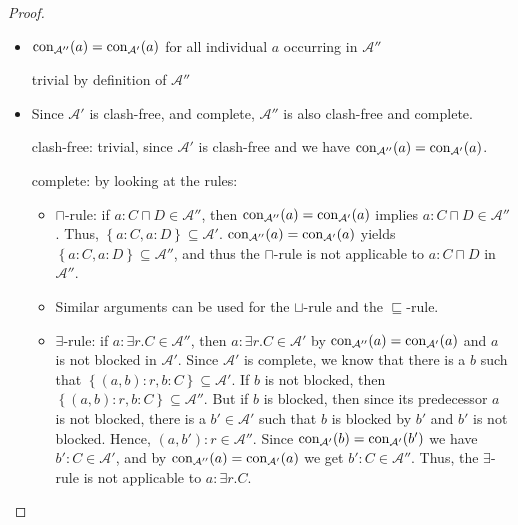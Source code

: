 \begin{proof}
\begin{itemize}
		\item $\operatorname{\text{con}}_{\mathcal{A}''}(a) =  \operatorname{\text{con}}_{\mathcal{A}'}(a)$ for all individual $a$ occurring in $\mathcal{A}''$ 
			\begin{subproof}
				trivial by definition of  $\mathcal{A}''$
			\end{subproof}

		\item Since $\mathcal{A}'$ is clash-free, and complete, $\mathcal{A}''$ is also clash-free and complete.
			\begin{subproof}
				clash-free: trivial, since  $\mathcal{A}'$ is clash-free
				and we have $\operatorname{\text{con}}_{\mathcal{A}''}(a) =  \operatorname{\text{con}}_{\mathcal{A}'}(a)$.

				complete: by looking at the rules:
				\begin{itemize}
					\item $\sqcap$-rule: if $a : C \sqcap D \in \mathcal{A}''$,
						then $\operatorname{\text{con}}_{\mathcal{A}''}(a) =  \operatorname{\text{con}}_{\mathcal{A}'}(a)$ implies
						$a : C \sqcap D \in \mathcal{A}''$.
						Thus, $\left\{ a:C, a:D \right\}\subseteq \mathcal{A}'$.
						$\operatorname{\text{con}}_{\mathcal{A}''}(a) =  \operatorname{\text{con}}_{\mathcal{A}'}(a)$	yields $\left\{ a:C, a:D \right\}\subseteq \mathcal{A}''$,
						and thus the $\sqcap$-rule is not applicable to $a:C \sqcap D$ in $\mathcal{A}''$.
					\item Similar arguments can be used for the $\sqcup$-rule and the $\sqsubseteq$-rule.
					\item $\exists$-rule: if $a: \exists r.C \in \mathcal{A}''$,
						then $a : \exists r.C \in \mathcal{A}'$ by $\operatorname{\text{con}}_{\mathcal{A}''}(a) =  \operatorname{\text{con}}_{\mathcal{A}'}(a)$
						and $a$ is not blocked in $\mathcal{A}'$.
						Since $\mathcal{A}'$ is complete, we know that there is a $b$ such that
						$\left\{ (a,b):r, b:C \right\} \subseteq \mathcal{A}'$.
						If $b$ is not blocked, then $\left\{ (a,b):r, b:C \right\} \subseteq \mathcal{A}''$.
						But if $b$ is blocked, then since its predecessor $a$ is not blocked,
						there is a $b' \in \mathcal{A}'$ such that $b$ is blocked by $b'$
						and $b'$ is not blocked.
						Hence, $(a,b'):r \in \mathcal{A}''$.
						Since $\operatorname{\text{con}}_{\mathcal{A}'}(b) =  \operatorname{\text{con}}_{\mathcal{A}'}(b')$ we have
						$b':C \in \mathcal{A}'$, and by $\operatorname{\text{con}}_{\mathcal{A}''}(a) =  \operatorname{\text{con}}_{\mathcal{A}'}(a)$ we get
						$b':C \in \mathcal{A}''$.
						Thus, the $\exists$-rule is not applicable to $a: \exists r.C$.
						\qedhere
				\end{itemize}
			\end{subproof}
	\end{itemize}
\end{proof}
